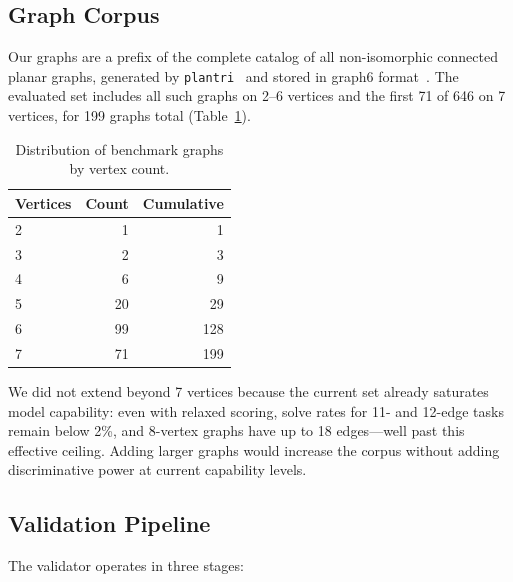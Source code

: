 \documentclass{article}
\begin{document}
\subsection{Graph Corpus}

Our graphs are a prefix of the complete catalog of all non-isomorphic connected planar graphs, generated by \texttt{plantri}~\citep{brinkmann2007,mckay2024} and stored in graph6 format~\citep{mckay2014}. The evaluated set includes all such graphs on 2--6 vertices and the first 71 of 646 on 7 vertices, for 199 graphs total (Table~\ref{tab:vertex-dist}).

\begin{table}[h]
\centering
\caption{Distribution of benchmark graphs by vertex count.}
\label{tab:vertex-dist}
\small
\begin{tabular}{@{}lrr@{}}
\toprule
Vertices & Count & Cumulative \\
\midrule
2 & 1 & 1 \\
3 & 2 & 3 \\
4 & 6 & 9 \\
5 & 20 & 29 \\
6 & 99 & 128 \\
7 & 71 & 199 \\
\bottomrule
\end{tabular}
\end{table}

We did not extend beyond 7 vertices because the current set already saturates model capability: even with relaxed scoring, solve rates for 11- and 12-edge tasks remain below 2\%, and 8-vertex graphs have up to 18 edges---well past this effective ceiling. Adding larger graphs would increase the corpus without adding discriminative power at current capability levels.

\subsection{Validation Pipeline}

The validator operates in three stages:
\end{document}
